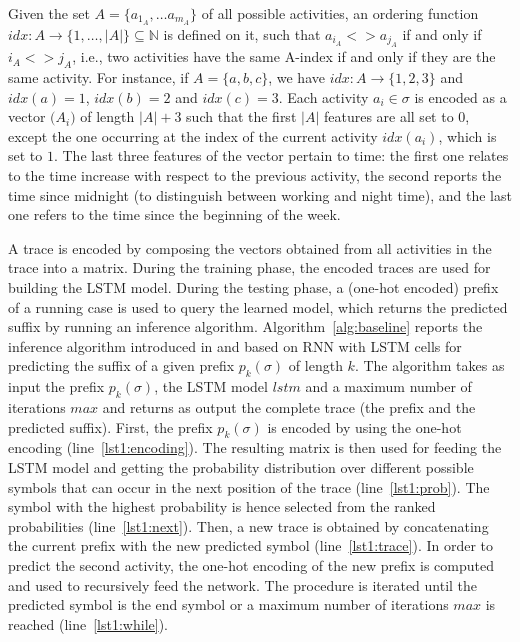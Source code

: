 Given the set $A = \{a_{1_A}, \ldots a_{m_A}\}$ of all possible activities, an ordering function $idx:A \rightarrow \{1, \ldots, \left|A\right| \} \subseteq \mathbb{N}$ is defined on it, such that $a_{i_A}<>a_{j_A}$ if and only if $i_A<>j_A$, i.e., two activities have the same A-index if and only if they are the same activity. For instance, if $A=\{a,b,c\}$, we have $idx: A \rightarrow \{1,2,3\}$ and $idx(a)=1$, $idx(b)=2$ and $idx(c)=3$. Each activity $a_i \in \sigma$ is encoded as a vector $\mathbb(A_i)$ of length $|A|+3$ such that the first $|A|$ features are all set to $0$, except the one occurring at the index of the current activity $idx(a_i)$, which is set to $1$. The last three features of the vector pertain to time: the first one relates to the time increase with respect to the previous activity, the second reports the time since midnight (to distinguish between working and night time), and the last one refers to the time since the beginning of the week.

A trace is encoded by composing the vectors obtained from all activities in the trace into a matrix. During the training phase, the encoded traces are used for building the LSTM model. During the testing phase, a (one-hot encoded) prefix of a running case is used to query the learned model, which returns the predicted suffix by running an inference algorithm.
Algorithm~\ref{alg:baseline} reports the inference algorithm introduced in \cite{niek96732} and based on RNN with LSTM cells for predicting the suffix of a given prefix $p_k(\sigma)$ of length $k$. The algorithm takes as input the prefix $p_k(\sigma)$, the LSTM model $lstm$ and a maximum number of iterations $max$ and returns as output the complete trace (the prefix and the predicted suffix).
First, the prefix $p_k(\sigma)$ is encoded by using the one-hot encoding (line~\ref{lst1:encoding}). The resulting matrix is then used for feeding the LSTM model and getting the probability distribution over different possible symbols that can occur in the next position of the trace (line~\ref{lst1:prob}). The symbol with the highest probability is hence selected from the ranked probabilities (line~\ref{lst1:next}). Then, a new trace is obtained by concatenating the current prefix with the new predicted symbol (line~\ref{lst1:trace}). In order to predict the second activity, the one-hot encoding of the new prefix is computed and used to recursively feed the network. The procedure is iterated until the predicted symbol is the end symbol or a maximum number of iterations $max$ is reached (line~\ref{lst1:while}).

